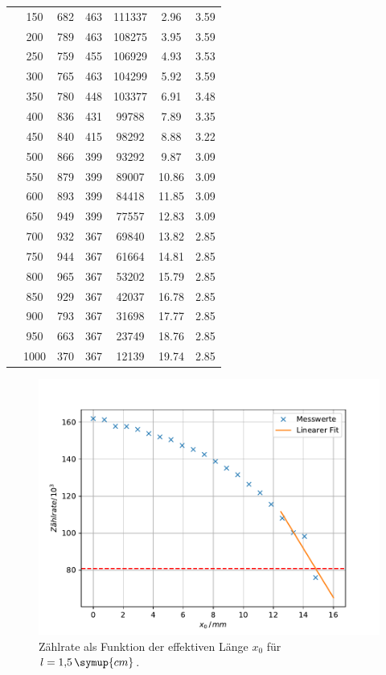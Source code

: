 \begin{table}[h!tbp]
\begin{tabular}{S[table-format=1.1] S[table-format=4] S[table-format=4] S[table-format=3] S[table-format=6] S[table-format=2.2] S[table-format=1.2] }
	   & 150 & 682 & 463 & 111337 & 2.96 & 3.59\\	   
	   & 200 & 789 & 463 & 108275 & 3.95 & 3.59\\
	   & 250 & 759 & 455 & 106929 & 4.93 & 3.53\\
	   & 300 & 765 & 463 & 104299 & 5.92 & 3.59\\
	   & 350 & 780 & 448 & 103377 & 6.91 & 3.48\\
	   & 400 & 836 & 431 & 99788 &  7.89 & 3.35\\
	   & 450 & 840 & 415 & 98292 & 8.88 & 3.22\\
	   & 500 & 866 & 399 & 93292 & 9.87 & 3.09\\
 	   & 550 & 879 & 399 & 89007 & 10.86 & 3.09\\
	   & 600 & 893 & 399 & 84418 & 11.85 & 3.09\\
	   & 650 & 949 & 399 & 77557 & 12.83 & 3.09\\
	   & 700 & 932 & 367 & 69840 & 13.82 & 2.85\\
	   & 750 & 944 & 367 & 61664 & 14.81 & 2.85\\
	   & 800 & 965 & 367 & 53202 & 15.79 & 2.85\\
	   & 850 & 929 & 367 & 42037 & 16.78 & 2.85\\
	   & 900 & 793 & 367 & 31698 & 17.77 & 2.85\\
	   & 950 & 663 & 367 & 23749 & 18.76 & 2.85\\
	   & 1000 & 370 & 367 & 12139 & 19.74 & 2.85\\
\bottomrule
\end{tabular}
\end{table}


\begin{figure}[h!tbp]
	\centering
	\includegraphics[width=0.8\linewidth]{zaehlrate_weglaenge.pdf}
	\caption{Zählrate als Funktion der effektiven Länge $x_0$ für $l=1{,}5\,\symup{cm}$.}
	\label{fig:zaehlrate1}
\end{figure}

